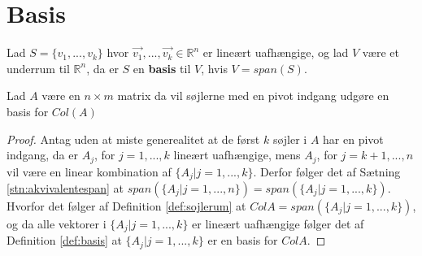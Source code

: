 \section{Basis}

\begin{defn}
Lad $S =\{v_1,...,v_k\}$ hvor $\vec{v_1},...,\vec{v_k} \in \mathds{R}^n$ er lineært uafhængige, og lad $V$ være et underrum til $\mathds{R}^n$, da er $S$ en \textbf{basis} til $V$, hvis $V = span(S)$.
\label{def:basis}
\end{defn}

\begin{stn}
Lad $A$ være en $n \times m$ matrix da vil søjlerne med en pivot indgang udgøre en basis for $Col (A)$
\end{stn}

\begin{proof}
Antag uden at miste generealitet at de først $k$ søjler i $A$ har en pivot indgang, da er $A_j$, for $j=1,...,k$ lineært uafhængige, mens $A_j$, for $j = k+1,...,n$ vil være en linear kombination af $\{A_j | j = 1,...,k\}$. 
Derfor følger det af Sætning \ref{stn:akvivalentespan} at $span(\{A_j| j =1,...,n\}) =span(\{A_j| j=1,...,k\})$.
Hvorfor det følger af Definition \ref{def:sojlerum} at $Col A = span(\{A_j| j=1,...,k\})$, og da alle vektorer i $\{A_j | j = 1,...,k\}$ er lineært uafhængige følger det af Definition \ref{def:basis} at $\{A_j | j = 1,...,k\}$ er en basis for $Col A$.
\end{proof}
